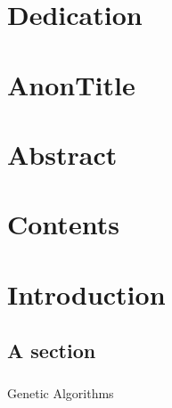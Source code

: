 \documentclass[a4paper]{report}
\begin{document}

\chapter*{Dedication}
\chapter*{AnonTitle}
\chapter*{Abstract}
\chapter*{Contents}
\chapter*{Introduction}

\section{A section}
\subsection{}
Genetic Algorithms
\appendix
\renewcommand\bibname{References}


\end{document}
